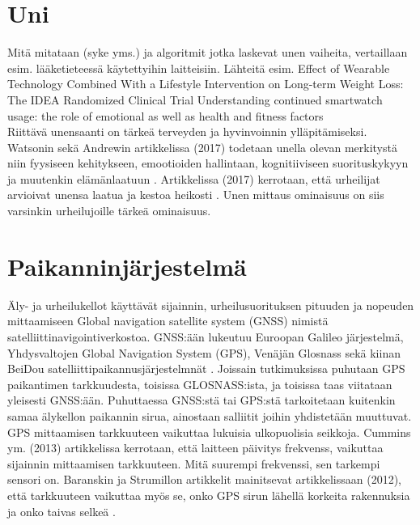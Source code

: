 \documentclass[utf8,bachelor,finnish]{bachelor}
\begin{document}
  \section{Uni}
  Mitä mitataan (syke yms.) ja algoritmit jotka laskevat unen vaiheita, vertaillaan esim. lääketieteessä käytettyihin laitteisiin.
  Lähteitä esim. 
  Effect of Wearable Technology Combined With a Lifestyle Intervention on Long-term Weight Loss: The IDEA Randomized Clinical Trial \parencite{jakicic_effect_2016}
  Understanding continued smartwatch usage: the role of emotional as well as health and fitness factors \parencite{siepmann_understanding_2021}\\

  Riittävä unensaanti on tärkeä terveyden ja hyvinvoinnin ylläpitämiseksi. Watsonin sekä Andrewin artikkelissa (2017) todetaan unella olevan merkitystä niin fyysiseen kehitykseen,
   emootioiden hallintaan, kognitiiviseen suorituskykyyn ja muutenkin elämänlaatuun \parencite{watson_sleep_2017}. 
    Artikkelissa (2017) kerrotaan, että urheilijat arvioivat unensa laatua ja kestoa heikosti \parencite{watson_sleep_2017}. Unen mittaus ominaisuus on siis varsinkin urheilujoille
     tärkeä ominaisuus.
         
  \section{Paikanninjärjestelmä}
  Äly- ja urheilukellot käyttävät sijainnin, urheilusuorituksen pituuden ja nopeuden mittaamiseen Global navigation satellite system (GNSS) nimistä satelliittinavigointiverkostoa. 
   GNSS:ään lukeutuu Euroopan Galileo järjestelmä, Yhdysvaltojen Global Navigation System (GPS), Venäjän Glosnass sekä kiinan BeiDou satelliittipaikannusjärjestelmnät \parencite{hofmann2007gnss}.
    Joissain tutkimuksissa puhutaan GPS paikantimen tarkkuudesta, toisissa GLOSNASS:ista, ja toisissa taas viitataan yleisesti GNSS:ään. Puhuttaessa GNSS:stä tai GPS:stä tarkoitetaan kuitenkin
     samaa älykellon paikannin sirua, ainostaan salliitit joihin yhdistetään muuttuvat. \\

  
  GPS mittaamisen tarkkuuteen vaikuttaa lukuisia ulkopuolisia seikkoja. Cummins ym. (2013) artikkelissa kerrotaan, että laitteen päivitys frekvenss, vaikuttaa sijainnin mittaamisen tarkkuuteen.
   Mitä suurempi frekvenssi, sen tarkempi sensori on. \parencite{cummins_global_2013} Baranskin ja Strumillon artikkelit mainitsevat artikkelissaan (2012), että tarkkuuteen vaikuttaa myös
    se, onko GPS sirun lähellä korkeita rakennuksia ja onko taivas selkeä \parencite{baranski_enhancing_2012}. \\
\end{document}
